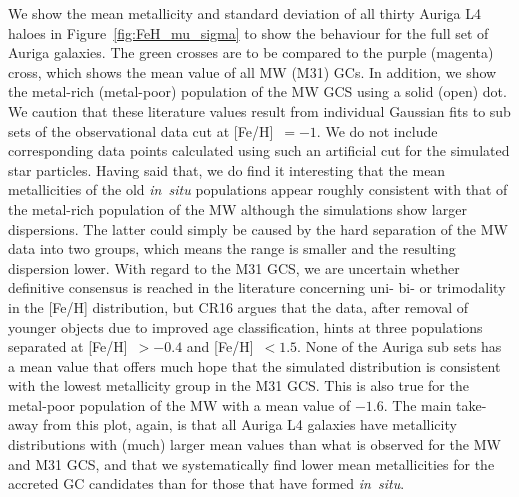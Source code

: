 \documentclass[a4paper,fleqn,usenatbib]{mnras}
\begin{document}
We show the mean metallicity and standard deviation of all thirty Auriga L4 haloes
in Figure~\ref{fig:FeH_mu_sigma} to show the behaviour for the full set of Auriga
galaxies. The green crosses are to be compared to the purple (magenta) cross, 
which shows the mean value of all MW (M31) GCs. In addition, we show the metal-rich 
(metal-poor) population of the MW GCS using a solid (open) dot. We caution that
these literature values result from individual Gaussian fits to sub sets of the 
observational data cut at [Fe/H]~$= -1$. We do not include corresponding data 
points calculated using such an artificial cut for the simulated star particles.
Having said that, we do find it interesting that the mean metallicities of the 
old {\it in~situ} populations appear roughly consistent with that of the metal-rich 
population of the MW although the simulations show larger dispersions. The latter 
could simply be caused by the hard separation of the MW data into two groups, 
which means the range is smaller and the resulting dispersion lower. With 
regard to the M31 GCS, we are uncertain whether definitive consensus is reached
in the literature concerning uni- bi- or trimodality in the [Fe/H] distribution, 
but CR16 argues that the data, after removal of younger objects due to improved 
age classification, hints at three populations separated at [Fe/H]~$>-0.4$ and 
[Fe/H]~$ < 1.5$. None of the Auriga sub sets has a mean value that offers much 
hope that the simulated distribution is consistent with the lowest metallicity 
group in the M31 GCS. This is also true for the metal-poor population of the 
MW with a mean value of $-1.6$. The main take-away from this plot, again, is 
that all Auriga L4 galaxies have metallicity distributions with (much) larger
mean values than what is observed for the MW and M31 GCS, and that we 
systematically find lower mean metallicities for the accreted GC candidates
than for those that have formed {\it in~situ}.

\end{document}
